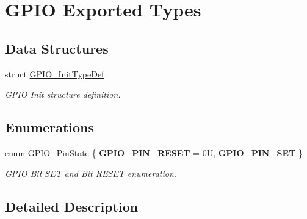 \hypertarget{group___g_p_i_o___exported___types}{}\section{G\+P\+IO Exported Types}
\label{group___g_p_i_o___exported___types}
\subsection*{Data Structures}
\begin{DoxyCompactItemize}
\item 
struct \hyperlink{struct_g_p_i_o___init_type_def}{G\+P\+I\+O\+\_\+\+Init\+Type\+Def}
\begin{DoxyCompactList}\small\item\em G\+P\+IO Init structure definition. \end{DoxyCompactList}\end{DoxyCompactItemize}
\subsection*{Enumerations}
\begin{DoxyCompactItemize}
\item 
\mbox{\label{group___g_p_i_o___exported___types_ga5b3ef0486b179415581eb342e0ea6b43}} 
enum \hyperlink{group___g_p_i_o___exported___types_ga5b3ef0486b179415581eb342e0ea6b43}{G\+P\+I\+O\+\_\+\+Pin\+State} \{ {\bfseries G\+P\+I\+O\+\_\+\+P\+I\+N\+\_\+\+R\+E\+S\+ET} = 0U, 
{\bfseries G\+P\+I\+O\+\_\+\+P\+I\+N\+\_\+\+S\+ET}
 \}\begin{DoxyCompactList}\small\item\em G\+P\+IO Bit S\+ET and Bit R\+E\+S\+ET enumeration. \end{DoxyCompactList}
\end{DoxyCompactItemize}


\subsection{Detailed Description}
